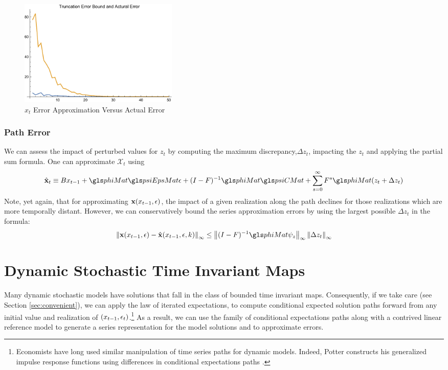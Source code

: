 \documentclass[12pt]{article}
\begin{document}
\begin{figure}
  \centering


\includegraphics[width=3in]{arbTruncErr.pdf}  
  \caption{$x_t$ Error Approximation Versus Actual Error} \label{figArbTrunc}

\end{figure}

\subsubsection{Path Error}


We can assess the impact of perturbed values for $z_t$ by computing the maximum discrepancy,$\Delta z_t$, impacting the $z_t$ and applying the 
partial sum formula.
One can  approximate $\mathcal{X}_t$ using
 	 \begin{gather}
 	 \xWOargK_t \equiv B x_{t-1}+ \phiMat \psiEpsMat\epsilon  + (I - F)^{-1} \phiMat \psiCMat + \sum_{s=0}^\infty F^s \phiMat (z_{t}+\Delta z_{t})\label{theDeltaSeries}
 \end{gather}
Note, yet again, that for approximating $\mathbf{x}(x_{t-1},\epsilon)$, the impact of  a given realization along the path declines for those realizations which are  more temporally distant.
However, we can conservatively bound the  series approximation  errors by using the largest possible $\Delta z_t$ in the formula:
    \begin{gather}
\infNorm{\xWarg-\xWargK} \le \infNorm{(I -F)^{-1} \phiMat \psi_z}  \infNorm{\Delta z_t } \label{pathErr}
    \end{gather}


\label{sec:pathnorm}

\clearpage
\section{Dynamic Stochastic Time Invariant Maps}
\label{sec:extToMaps}

Many dynamic stochastic models have solutions that 
fall in the class of bounded time invariant maps.
Consequently, if we take care (see Section \ref{sec:convenient}), we can apply the law of iterated expectations, 
to compute conditional expected solution paths 
forward from any initial value and realization of $(x_{t-1},\epsilon_t)$.\footnote{Economists have long used similar manipulation of
time series paths for dynamic models. 
Indeed, Potter constructs his generalized impulse response functions using
differences in conditional expectations paths \citep{Potter2000,Koop1996a}.
}
As a result, we can use the family of conditional expectations paths 
along with a contrived linear reference model to generate
a series representation for the model solutions  and
to approximate errors.
\end{document}
